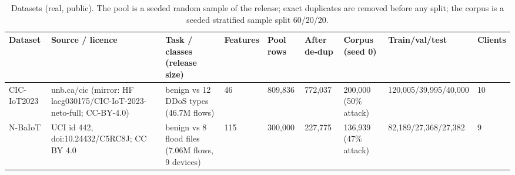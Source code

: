 \begin{table}[t]
\centering
\caption{Datasets (real, public). The pool is a seeded random sample of the release; exact duplicates are removed before any split; the corpus is a seeded stratified sample split 60/20/20.}
\label{tab:datasets}
\scriptsize
\setlength{\tabcolsep}{2.4pt}
\begin{tabular}{p{1.0cm}p{3.6cm}p{2.6cm}p{0.7cm}p{0.9cm}p{0.9cm}p{1.6cm}p{2.5cm}p{0.5cm}}
\toprule
Dataset & Source / licence & Task / classes (release size) & Features & Pool rows & After de-dup & Corpus (seed 0) & Train/val/test & Clients \\
\midrule
CIC-IoT2023 & unb.ca/cic (mirror: HF lacg030175/CIC-IoT-2023-neto-full; CC-BY-4.0) \cite{neto2023} & benign vs 12 DDoS types (46.7M flows) & 46 & 809,836 & 772,037 & 200,000 (50\% attack) & 120,005/39,995/40,000 & 10 \\
N-BaIoT & UCI id 442, doi:10.24432/C5RC8J; CC BY 4.0 \cite{meidan2018} & benign vs 8 flood files (7.06M flows, 9 devices) & 115 & 300,000 & 227,775 & 136,939 (47\% attack) & 82,189/27,368/27,382 & 9 \\
\bottomrule
\end{tabular}
\end{table}